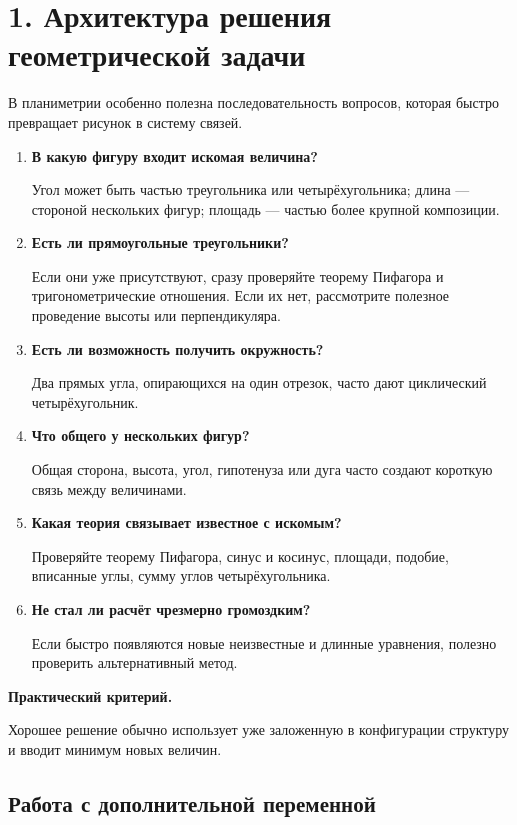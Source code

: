 \documentclass[a4paper,12pt]{article}
\newcommand{\important}[1]{%
  \textbf{\color{darkaccent}#1}%
}
\newcommand{\checkq}[1]{%
  \textbf{\color{accent}#1}%
}
\begin{document}
\section{1. Архитектура решения геометрической задачи}

В планиметрии особенно полезна последовательность вопросов,
которая быстро превращает рисунок в систему связей.

\begin{enumerate}

  \item
  \checkq{В какую фигуру входит искомая величина?}

  Угол может быть частью треугольника или четырёхугольника;
  длина --- стороной нескольких фигур;
  площадь --- частью более крупной композиции.

  \item
  \checkq{Есть ли прямоугольные треугольники?}

  Если они уже присутствуют, сразу проверяйте
  теорему Пифагора и тригонометрические отношения.
  Если их нет, рассмотрите полезное проведение
  высоты или перпендикуляра.

  \item
  \checkq{Есть ли возможность получить окружность?}

  Два прямых угла, опирающихся на один отрезок,
  часто дают циклический четырёхугольник.

  \item
  \checkq{Что общего у нескольких фигур?}

  Общая сторона, высота, угол, гипотенуза или дуга
  часто создают короткую связь между величинами.

  \item
  \checkq{Какая теория связывает известное с искомым?}

  Проверяйте теорему Пифагора, синус и косинус,
  площади, подобие, вписанные углы,
  сумму углов четырёхугольника.

  \item
  \checkq{Не стал ли расчёт чрезмерно громоздким?}

  Если быстро появляются новые неизвестные
  и длинные уравнения, полезно проверить
  альтернативный метод.

\end{enumerate}

\important{Практический критерий.}
Хорошее решение обычно использует уже заложенную
в конфигурации структуру и вводит минимум новых величин.

\subsection{Работа с дополнительной переменной}
\end{document}
